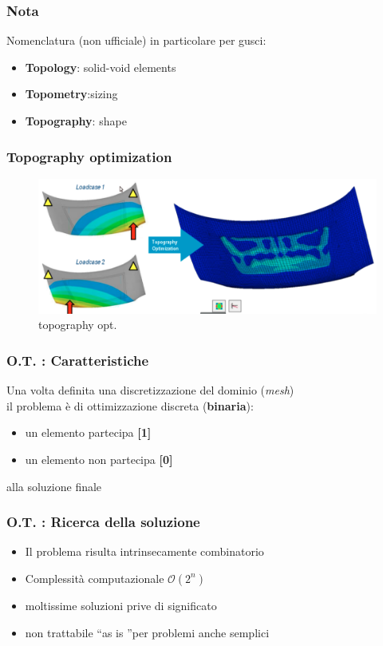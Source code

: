 \documentclass{beamer}
\begin{document}
\begin{frame}
	\frametitle{Nota}
	Nomenclatura (non ufficiale) in particolare per gusci: \\
	\begin{itemize}
		\item \textbf{Topology}: solid-void elements
		\item \textbf{Topometry}:sizing
		\item \textbf{Topography}: shape
	\end{itemize}
\end{frame}

\begin{frame}
	\frametitle{Topography optimization}
	\begin{figure}
		\includegraphics[width=0.9\linewidth]{./images/topography.png}
		\caption{topography opt.}
		\label{fig:topography}
	\end{figure}	
\end{frame}

\begin{frame}
	\frametitle{O.T. : Caratteristiche}
	Una volta definita una discretizzazione del dominio (\textit{mesh}) \\ il problema \`{e} di ottimizzazione discreta (\textbf{binaria}):
	\begin{itemize}
		\item un elemento partecipa \textbf{[1]}
		\item un elemento non partecipa \textbf{[0]}
	\end{itemize}
	alla soluzione finale
\end{frame}


\begin{frame}
	\frametitle{O.T. : Ricerca della soluzione}
	\begin{itemize}
		\item Il problema risulta intrinsecamente combinatorio
		\item Complessit\`{a} computazionale $\mathcal{O}(2^n)$
		\item moltissime soluzioni prive di significato
		\item non trattabile \textquotedblleft as is \textquotedblright per problemi anche semplici
	\end{itemize}
\end{frame}
\end{document}
